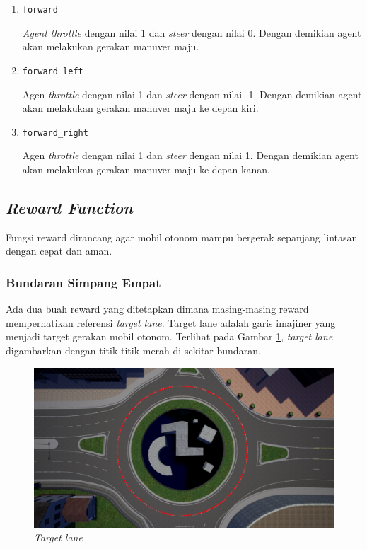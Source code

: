 \documentclass[conference]{IEEEtran}
\begin{document}
\begin{enumerate}[nolistsep]
	\item \verb=forward=
	
	\textit{Agent} \textit{throttle} dengan nilai 1 dan \textit{steer} dengan nilai 0. Dengan demikian agent akan melakukan gerakan manuver maju.
	
	\item \verb=forward_left=
	
	Agen \textit{throttle} dengan nilai 1 dan \textit{steer} dengan nilai -1. Dengan demikian agent akan melakukan gerakan manuver maju ke depan kiri.
	
	\item \verb=forward_right=
	
	Agen \textit{throttle} dengan nilai 1 dan \textit{steer} dengan nilai 1. Dengan demikian agent akan melakukan gerakan manuver maju ke depan kanan.
	
\end{enumerate}

\subsection{\textit{Reward Function}}
\label{sec:sistem_reward}

Fungsi reward dirancang agar mobil otonom mampu bergerak sepanjang lintasan dengan cepat dan aman.

\subsubsection{Bundaran Simpang Empat}Ada dua buah reward yang ditetapkan dimana masing-masing reward memperhatikan referensi \textit{target lane}. Target lane adalah garis imajiner yang menjadi target gerakan mobil otonom. Terlihat pada Gambar \ref{fig:target_lane_line}, \textit{target lane} digambarkan dengan titik-titik merah di sekitar bundaran.

\begin{figure}[H] 
	\centering
	\includegraphics[width=1\linewidth]{images/target_lane_line}
	\caption{\textit{Target lane}}
	\label{fig:target_lane_line}
\end{figure}
\end{document}
